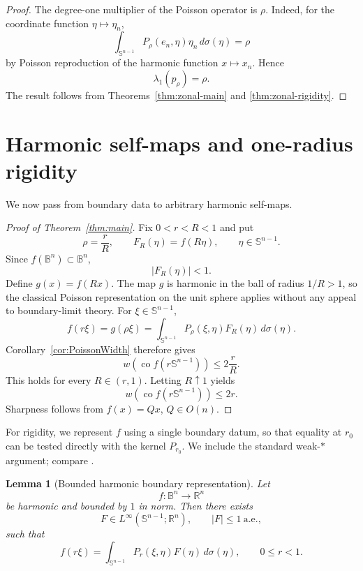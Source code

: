 \documentclass[11pt,reqno]{amsart}
\newtheorem{lemma}[theorem]{Lemma}
\theoremstyle{remark}
\begin{document}
\begin{proof}
The degree-one multiplier of the Poisson operator is $\rho$.  Indeed, for
the coordinate function $\eta\mapsto\eta_n$,
\[
 \int_{\mathbb S^{n-1}}
 P_\rho(e_n,\eta)\eta_n\,d\sigma(\eta)
 =
 \rho
\]
by Poisson reproduction of the harmonic function $x\mapsto x_n$.  Hence
\[
 \lambda_1(p_\rho)=\rho.
\]
The result follows from Theorems~\ref{thm:zonal-main} and
\ref{thm:zonal-rigidity}.
\end{proof}

\section{Harmonic self-maps and one-radius rigidity}

We now pass from boundary data to arbitrary harmonic self-maps.

\begin{proof}[Proof of Theorem~\ref{thm:main}]
Fix $0<r<R<1$ and put
\[
 \rho=\frac rR,\qquad
 F_R(\eta)=f(R\eta),\qquad \eta\in\mathbb S^{n-1}.
\]
Since $f(\mathbb B^n)\subset\mathbb B^n$,
\[
 |F_R(\eta)|<1.
\]
Define $g(x)=f(Rx)$.  The map $g$ is harmonic in the ball of radius $1/R>1$,
so the classical Poisson representation on the unit sphere applies without
any appeal to boundary-limit theory.  For $\xi\in\mathbb S^{n-1}$,
\[
 f(r\xi)
 =
 g(\rho\xi)
 =
 \int_{\mathbb S^{n-1}}
 P_\rho(\xi,\eta)F_R(\eta)\,d\sigma(\eta).
\]
Corollary~\ref{cor:PoissonWidth} therefore gives
\[
 w\!\left(\operatorname{co}f(r\mathbb S^{n-1})\right)
 \le
 2\frac rR.
\]
This holds for every $R\in(r,1)$.  Letting $R\uparrow1$ yields
\[
 w\!\left(\operatorname{co}f(r\mathbb S^{n-1})\right)\le2r.
\]
Sharpness follows from $f(x)=Qx$, $Q\in O(n)$.
\end{proof}

For rigidity, we represent $f$ using a single boundary datum, so that
equality at $r_0$ can be tested directly with the kernel $P_{r_0}$.
We include the standard weak-$*$ argument; compare
\cite[Theorem~6.13]{AxlerBourdonRamey}.

\begin{lemma}[Bounded harmonic boundary representation]
\label{lem:boundary-representation}
Let
\[
 f:\mathbb B^n\to\mathbb R^n
\]
be harmonic and bounded by $1$ in norm.  Then there exists
\[
 F\in L^\infty(\mathbb S^{n-1};\mathbb R^n),
 \qquad |F|\le1\ \text{a.e.},
\]
such that
\begin{equation}\label{eq:boundary-representation}
 f(r\xi)
 =
 \int_{\mathbb S^{n-1}}
 P_r(\xi,\eta)F(\eta)\,d\sigma(\eta),
 \qquad 0\le r<1.
\end{equation}
\end{lemma}
\end{document}
